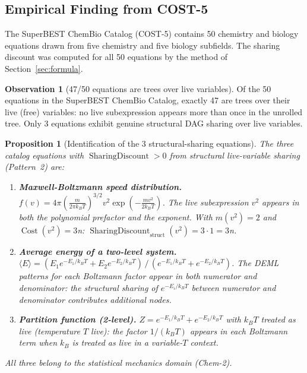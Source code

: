\documentclass[12pt,a4paper]{article}
\newtheorem{proposition}[theorem]{Proposition}
\theoremstyle{definition}
\newtheorem{observation}[theorem]{Observation}
\newcommand{\Cost}{\operatorname{Cost}}
\newcommand{\SD}{\operatorname{SharingDiscount}}
\begin{document}
\subsection{Empirical Finding from COST-5}

The SuperBEST ChemBio Catalog (COST-5) contains 50 chemistry and biology
equations drawn from five chemistry and five biology subfields.  The
sharing discount was computed for all 50 equations by the method of
Section~\ref{sec:formula}.

\begin{observation}[47/50 equations are trees over live variables]
\label{obs:trees}
Of the 50 equations in the SuperBEST ChemBio Catalog, exactly 47 are
trees over their live (free) variables: no live subexpression appears
more than once in the unrolled tree.  Only 3 equations exhibit genuine
structural DAG sharing over live variables.
\end{observation}

\begin{proposition}[Identification of the 3 structural-sharing equations]
\label{prop:three}
The three catalog equations with $\SD > 0$ from structural live-variable
sharing (Pattern~2) are:
\begin{enumerate}[nosep]
  \item \textbf{Maxwell-Boltzmann speed distribution.}
        $f(v) = 4\pi\left(\tfrac{m}{2\pi k_B T}\right)^{3/2}
        v^2 \exp\!\left(-\tfrac{mv^2}{2k_BT}\right)$.
        The live subexpression $v^2$ appears in both the polynomial prefactor
        and the exponent.  With $m(v^2) = 2$ and $\Cost(v^2) = 3$n:
        $\SD_{\mathrm{struct}}(v^2) = 3 \cdot 1 = 3$n.
  \item \textbf{Average energy of a two-level system.}
        $\langle E \rangle = (E_1 e^{-E_1/k_BT} + E_2 e^{-E_2/k_BT})\,/\,
        (e^{-E_1/k_BT} + e^{-E_2/k_BT})$.
        The DEML patterns for each Boltzmann factor appear in both numerator
        and denominator: the structural sharing of $e^{-E_i/k_BT}$ between
        numerator and denominator contributes additional nodes.
  \item \textbf{Partition function (2-level).}
        $Z = e^{-E_1/k_BT} + e^{-E_2/k_BT}$ with $k_BT$ treated as live
        (temperature $T$ live): the factor $1/(k_BT)$ appears in each
        Boltzmann term when $k_B$ is treated as live in a variable-$T$
        context.
\end{enumerate}
All three belong to the statistical mechanics domain (Chem-2).
\end{proposition}
\end{document}
